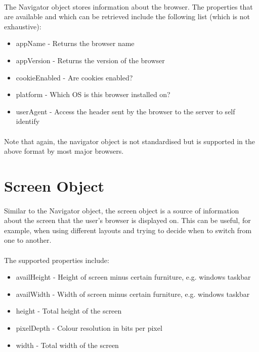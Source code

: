 \paragraph{} The Navigator object stores information about the browser. The properties that are available and which can be retrieved include the following list (which is not exhaustive):

\begin{itemize}
\item appName - Returns the browser name
\item appVersion - Returns the version of the browser
\item cookieEnabled - Are cookies enabled?
\item platform - Which OS is this browser installed on?
\item userAgent - Access the header sent by the browser to the server to self identify
\end{itemize}

\paragraph{} Note that again, the navigator object is not standardised but is supported in the above format by most major browsers.


\section{Screen Object}
\paragraph{} Similar to the Navigator object, the screen object is a source of information about the screen that the user’s browser is displayed on. This can be useful, for example, when using different layouts and trying to decide when to switch from one to another.

\paragraph{} The supported properties include:

\begin{itemize}
\item availHeight - Height of screen minus certain furniture, e.g. windows taskbar
\item availWidth - Width of screen minus certain furniture, e.g. windows taskbar
\item height - Total height of the screen
\item pixelDepth - Colour resolution in bits per pixel
\item width - Total width of the screen
\end{itemize}

